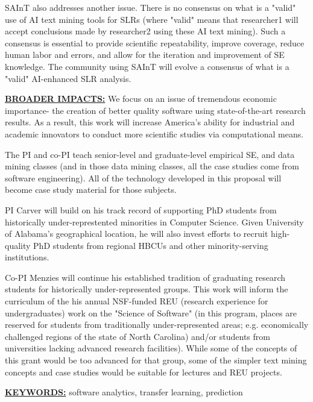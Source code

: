 SAInT also addresses another issue. There is no consensus on what is a "valid" use of AI text mining tools for SLRs (where "valid" means that researcher1 will accept    conclusions made by researcher2 using these AI text mining). Such a consensus is essential to provide scientific repeatability, improve coverage, reduce human labor and errors, and allow for the iteration and improvement of SE knowledge. The community using SAInT will evolve a consensus of what is a "valid" AI-enhanced SLR analysis.
  

\noindent
\underline{{\bf BROADER IMPACTS:}}
We focus on an issue of tremendous economic importance- the creation of better quality software using state-of-the-art research results. As a result, this work will increase America's ability for industrial and academic innovators to conduct more scientific studies via computational means.

The PI and co-PI teach senior-level and graduate-level empirical SE, and data  mining classes (and in those data mining classes, all the case studies come from software  engineering). All of the technology developed in this proposal will become case study material for those subjects.  

PI Carver will build on his track record of supporting PhD students from historically under-represtented minorities in Computer Science. Given University of Alabama's geographical location, he will also invest efforts to recruit high-quality PhD students from regional HBCUs and other minority-serving institutions.

Co-PI Menzies will continue his established tradition of graduating research students for historically under-represented groups. This work will inform the curriculum of the his annual NSF-funded REU (research experience for undergraduates) work on the "Science of Software" (in this program, places are reserved for students from traditionally under-represented areas; e.g. economically challenged regions of the state of North Carolina) and/or students from universities lacking advanced research facilities). While some of the concepts of this grant would be too advanced for that group, some of the simpler text mining concepts and case studies would be suitable for lectures and REU projects.

\noindent \underline{{\bf KEYWORDS:}} software analytics, transfer learning, prediction